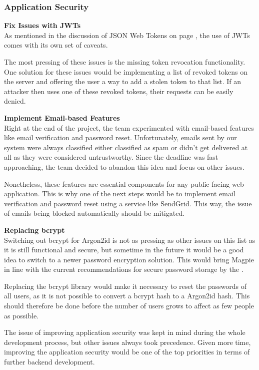\subsubsection{Application Security}
\textbf{Fix Issues with JWTs}\\
As mentioned in the discussion of JSON Web Tokens on page \pageref{jwt}, the use
of JWTs comes with its own set of caveats.

The most pressing of these issues is the missing token revocation functionality.
One solution for these issues would be implementing a list of revoked tokens on
the server and offering the user a way to add a stolen token to that list. If an
attacker then uses one of these revoked tokens, their requests can be easily
denied.

\textbf{Implement Email-based Features}\\
Right at the end of the project, the team experimented with email-based features
like email verification and password reset. Unfortunately, emails sent by our
system were always classified either classified as spam or didn't get delivered
at all as they were considered untrustworthy. Since the deadline was fast
approaching, the team decided to abandon this idea and focus on other issues.

Nonetheless, these features are essential components for any public facing web
application. This is why one of the next steps would be to implement email
verification and password reset using a service like SendGrid. This way, the
issue of emails being blocked automatically should be mitigated.

\textbf{Replacing bcrypt}\\
Switching out bcrypt for Argon2id is not as pressing as other issues on this
list as it is still functional and secure, but sometime in the future it would
be a good idea to switch to a newer password encryption solution. This would
bring Magpie in line with the current recommendations for secure password
storage by the \textcite{owasp_password_storage_cheatsheet}.

Replacing the bcrypt library would make it necessary to reset the passwords of
all users, as it is not possible to convert a bcrypt hash to a Argon2id hash.
This should therefore be done before the number of users grows to affect as few
people as possible.

The issue of improving application security was kept in mind during the whole
development process, but other issues always took precedence. Given more time,
improving the application security would be one of the top priorities in terms
of further backend development.

